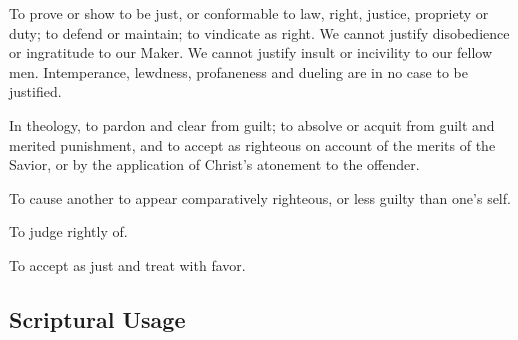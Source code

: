 		\begin{compactitem}
			\item To prove or show to be just, or conformable to law, right, justice, propriety or duty; to defend or maintain; to vindicate as right. We cannot justify disobedience or ingratitude to our Maker. We cannot justify insult or incivility to our fellow men. Intemperance, lewdness, profaneness and dueling are in no case to be justified.
			\item In theology, to pardon and clear from guilt; to absolve or acquit from guilt and merited punishment, and to accept as righteous on account of the merits of the Savior, or by the application of Christ's atonement to the offender.
			\item To cause another to appear comparatively righteous, or less guilty than one's self.
			\item To judge rightly of.
			\item To accept as just and treat with favor.
		\end{compactitem}


	


\subsection{Scriptural Usage} %
	\label{JUSTIFICATION-SCRIPTURES}

	
